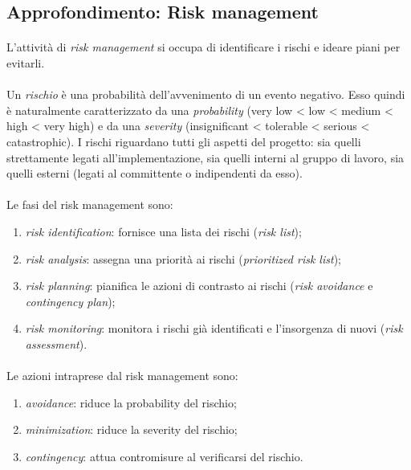 \documentclass[12pt,a4paper,twoside,english,italian]{book}
\begin{document}
\subsection{Approfondimento: Risk management}

\paragraph{} L'attività di \emph{risk management} \cite{risk_management} si occupa di identificare i rischi e ideare piani per evitarli.

\paragraph{} Un \emph{rischio} è una probabilità dell'avvenimento di un evento negativo. Esso quindi è naturalmente caratterizzato da una \emph{probability} (very low < low < medium < high < very high) e da una \emph{severity} (insignificant < tolerable < serious < catastrophic). I rischi riguardano tutti gli aspetti del progetto: sia quelli strettamente legati all'implementazione, sia quelli interni al gruppo di lavoro, sia quelli esterni (legati al committente o indipendenti da esso). 

\paragraph{} Le fasi del risk management sono:
\begin{enumerate}
    \item \emph{risk identification}: fornisce una lista dei rischi (\emph{risk list});
    \item \emph{risk analysis}: assegna una priorità ai rischi (\emph{prioritized risk list});
    \item \emph{risk planning}: pianifica le azioni di contrasto ai rischi (\emph{risk avoidance} e \emph{contingency plan});
    \item \emph{risk monitoring}: monitora i rischi già identificati e l'insorgenza di nuovi (\emph{risk assessment}).
\end{enumerate}

\paragraph{} Le azioni intraprese dal risk management sono:
\begin{enumerate}
    \item \emph{avoidance}: riduce la probability del rischio;
    \item \emph{minimization}: riduce la severity del rischio;
    \item \emph{contingency}: attua contromisure al verificarsi del rischio.
\end{enumerate}
\end{document}
